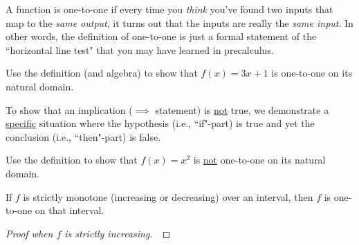 \begin{remark}
A function is one-to-one if every time you \textit{think} you've found two inputs that map to the \textit{same output}, it turns out that the inputs are really the \textit{same input}.
In other words, the definition of one-to-one is just a formal statement of the ``horizontal line test" that you may have learned in precalculus.
\end{remark}

\begin{example}
Use the definition (and algebra) to show that $f(x)=3x+1$ is one-to-one on its natural domain.
\end{example}

\ifdefined\SOLUTION
{}
\else
\fi
\vfill

\begin{remark}
To show that an implication ($\implies$ statement) is \underline{not} true, 
we demonstrate a \underline{specific} situation where the hypothesis (i.e., ``if"-part) is true and yet the conclusion (i.e., ``then"-part) is false.
\end{remark}

\begin{example}
Use the definition to show that $f(x)=x^2$ is \underline{not} one-to-one on its natural domain.
\end{example}
\ifdefined\SOLUTION
{}
\else
\fi
\vfill

\newpage

\begin{theorem}
If $f$ is strictly monotone (increasing or decreasing) over an interval, then $f$ is one-to-one on that interval.
\end{theorem}

\ifdefined\SOLUTION
{}
\vfill
\else
\begin{proof}[Proof when $f$ is strictly increasing]\,

\vspace{3.5in}

\end{proof}
\fi

